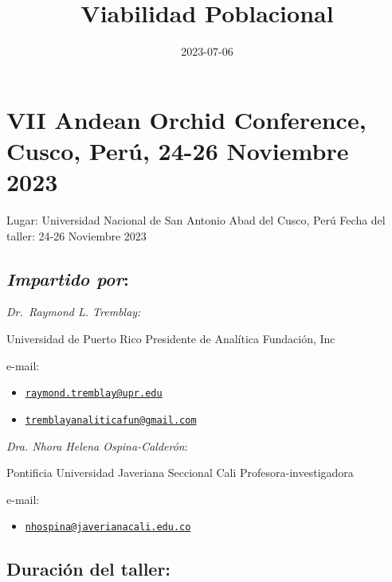 \documentclass[
]{book}
\title{Viabilidad Poblacional}
\author{}
\date{\vspace{-2.5em}2023-07-06}
\providecommand{\tightlist}{%
  \setlength{\itemsep}{0pt}\setlength{\parskip}{0pt}}
\theoremstyle{definition}
\theoremstyle{definition}
\theoremstyle{definition}
\theoremstyle{definition}
\theoremstyle{remark}
\begin{document}
\maketitle

{
\setcounter{tocdepth}{1}
\tableofcontents
}
\hypertarget{sec-vii-andean-orchid-conference-cusco-peruxfa-24-26-noviembre-2023}{%
\chapter{VII Andean Orchid Conference, Cusco, Perú, 24-26 Noviembre 2023}\label{sec-vii-andean-orchid-conference-cusco-peruxfa-24-26-noviembre-2023}}

Lugar: Universidad Nacional de San Antonio Abad del Cusco, Perú Fecha
del taller: 24-26 Noviembre 2023

\hypertarget{impartido-por}{%
\section{\texorpdfstring{\emph{Impartido por}:}{Impartido por:}}\label{impartido-por}}

\emph{Dr.~Raymond L. Tremblay:}

Universidad de Puerto Rico Presidente de Analítica Fundación, Inc

e-mail:

\begin{itemize}
\item
  \href{mailto:raymond.tremblay@upr.edu}{\nolinkurl{raymond.tremblay@upr.edu}}
\item
  \href{mailto:tremblayanaliticafun@gmail.com}{\nolinkurl{tremblayanaliticafun@gmail.com}}
\end{itemize}

\emph{Dra. Nhora Helena Ospina-Calderón}:

Pontificia Universidad Javeriana Seccional Cali Profesora-investigadora

e-mail:

\begin{itemize}
\tightlist
\item
  \href{mailto:nhospina@javerianacali.edu.co}{\nolinkurl{nhospina@javerianacali.edu.co}}
\end{itemize}

\hypertarget{duraciuxf3n-del-taller}{%
\section{Duración del taller:}\label{duraciuxf3n-del-taller}}
\end{document}
